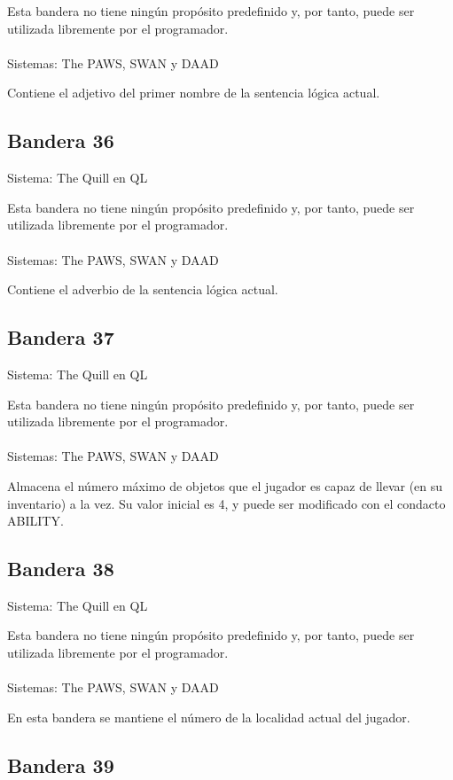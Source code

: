 \documentclass[11pt, a5paper]{article}
\newcommand{\quill}{\textsf{The Quill}\xspace}
\newcommand{\paw}{\textsf{The PAWS}\xspace}
\newcommand{\swan}{\textsf{SWAN}\xspace}
\newcommand{\daad}{\textsf{DAAD}\xspace}
\newcommand{\sistema}[1]{\noindent Sistema: #1 \nopagebreak}
\newcommand{\sistemas}[1]{\noindent Sistemas: #1 \nopagebreak}
\begin{document}
Esta bandera no tiene ningún propósito predefinido y, por tanto, puede ser utilizada libremente por el programador.
\\\ \\
\sistemas{\paw, \swan y \daad}

Contiene el adjetivo del primer nombre de la sentencia lógica actual.

\subsection{Bandera 36}

\sistema{\quill en QL}

Esta bandera no tiene ningún propósito predefinido y, por tanto, puede ser utilizada libremente por el programador.
\\\ \\
\sistemas{\paw, \swan y \daad}

Contiene el adverbio de la sentencia lógica actual.

\subsection{Bandera 37}

\sistema{\quill en QL}

Esta bandera no tiene ningún propósito predefinido y, por tanto, puede ser utilizada libremente por el programador.
\\\ \\
\sistemas{\paw, \swan y \daad}

Almacena el número máximo de objetos que el jugador es capaz de llevar (en su inventario) a la vez. Su valor inicial es 4, y puede ser modificado con el condacto ABILITY.

\subsection{Bandera 38}

\sistema{\quill en QL}

Esta bandera no tiene ningún propósito predefinido y, por tanto, puede ser utilizada libremente por el programador.
\\\ \\
\sistemas{\paw, \swan y \daad}

En esta bandera se mantiene el número de la localidad actual del jugador.

\subsection{Bandera 39}
\end{document}
